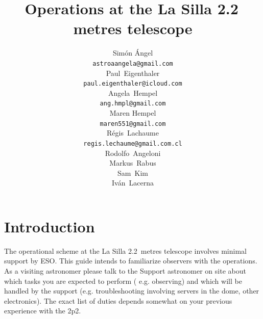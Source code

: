 \documentclass[11pt,fleqn,a4paper]{book}
\begin{document}
%
% 
\title{Operations at the La Silla 2.2\,metres telescope}%
\author{
	Sim\'on \'Angel\\[5pt]
	\texttt{astroaangela@gmail.com}\\[5pt]
	Paul~Eigenthaler\\
	\texttt{paul.eigenthaler@icloud.com}\\[5pt]
	Angela~Hempel\\
	\texttt{ang.hmpl@gmail.com}\\[5pt]
	Maren Hempel\\
	\texttt{maren551@gmail.com}\\[5pt]
     R\'egis~Lachaume\\
	\texttt{regis.lechaume@gmail.com.cl}\\[5pt]
    Rodolfo~Angeloni\\[5pt]
	Markus~Rabus\\ [5pt]
	Sam~Kim\\[5pt]
	Iv\'an~Lacerna\\[5pt]
	}%
%
\version{\today}
\maketitle

%
% 

\tableofcontents 
\cleardoublepage 

\listoffigures 
\cleardoublepage 

\listoftables
\cleardoublepage 

\listofprocedures

%
%

\chapter{Introduction}
The operational scheme at the La Silla 2.2~metres telescope involves minimal support by ESO.  This guide intends to familiarize observers with the operations. As a visiting astronomer please talk to the Support astronomer on site about which tasks you are expected to perform ( e.g. observing) and which will be handled by the support (e.g. troubleshooting involving servers in the dome, other electronics). The exact list of duties depends somewhat on your previous experience with the 2p2.
\end{document}

